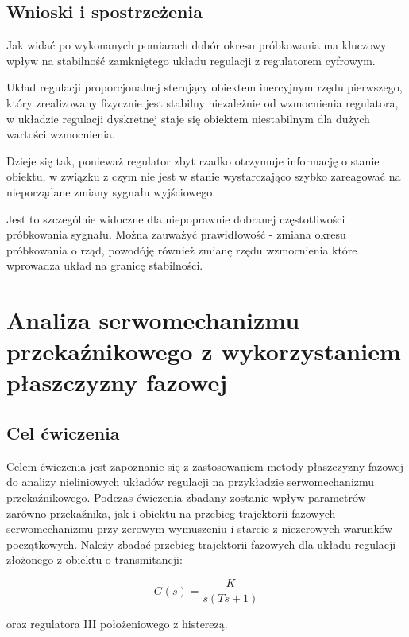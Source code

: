 \documentclass[12pt]{article}
\begin{document}
\newpage

\subsection{Wnioski i spostrzeżenia}

Jak widać po wykonanych pomiarach dobór okresu próbkowania ma kluczowy wpływ na
stabilność zamkniętego układu regulacji z regulatorem cyfrowym.

Układ regulacji proporcjonalnej sterujący obiektem inercyjnym rzędu pierwszego,
który zrealizowany fizycznie jest stabilny niezależnie od wzmocnienia regulatora, w
układzie regulacji dyskretnej staje się obiektem niestabilnym dla dużych
wartości wzmocnienia.

Dzieje się tak, ponieważ regulator zbyt rzadko otrzymuje informację o stanie
obiektu, w związku z czym nie jest w stanie wystarczająco szybko zareagować na
nieporządane zmiany sygnału wyjściowego.

Jest to szczególnie widoczne dla niepoprawnie dobranej
częstotliwości próbkowania sygnału. Można zauważyć prawidłowość - zmiana okresu
próbkowania o rząd, powodóję również zmianę rzędu wzmocnienia które wprowadza
układ na granicę stabilności.

\newpage

\section{Analiza serwomechanizmu przekaźnikowego z wykorzystaniem
 płaszczyzny fazowej}

\subsection{Cel ćwiczenia}

Celem ćwiczenia jest zapoznanie się z zastosowaniem metody płaszczyzny fazowej do analizy nieliniowych
układów regulacji na przykładzie serwomechanizmu przekaźnikowego. Podczas ćwiczenia zbadany zostanie
wpływ parametrów zarówno przekaźnika, jak i obiektu na przebieg trajektorii fazowych serwomechanizmu
przy zerowym wymuszeniu i starcie z niezerowych warunków początkowych. Należy zbadać przebieg
trajektorii fazowych dla układu regulacji złożonego z obiektu o transmitancji:

\begin{equation*}
	G(s)=\frac{K}{s(Ts+1)}
\end{equation*}

oraz regulatora III położeniowego z histerezą.
\end{document}
